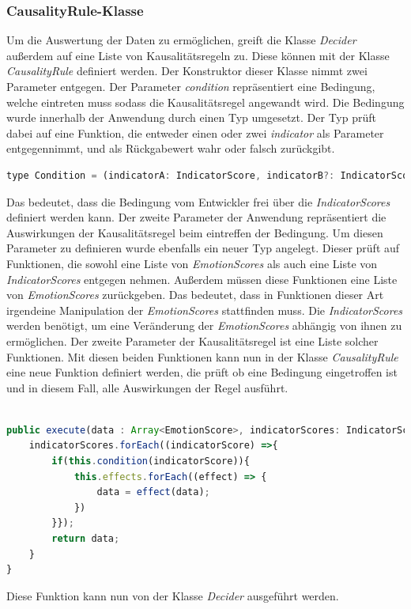 \subsubsection{CausalityRule-Klasse}
Um die Auswertung der Daten zu ermöglichen, greift die Klasse \textit{Decider} außerdem auf eine Liste von Kausalitätsregeln zu. Diese können mit der Klasse \textit{CausalityRule} definiert werden.
Der Konstruktor dieser Klasse nimmt zwei Parameter entgegen. Der Parameter \textit{condition} repräsentiert eine Bedingung, welche eintreten muss sodass die Kausalitätsregel angewandt wird. Die Bedingung wurde innerhalb der Anwendung durch einen Typ umgesetzt. Der Typ prüft dabei auf eine Funktion, die entweder einen oder zwei \textit{indicator} als Parameter entgegennimmt, und als Rückgabewert wahr oder falsch zurückgibt.\newline
\begin{lstlisting}[caption={Typ condition}, language=JavaScript]
	type Condition = (indicatorA: IndicatorScore, indicatorB?: IndicatorScore) => boolean;
\end{lstlisting}
Das bedeutet, dass die Bedingung vom Entwickler frei über die \textit{IndicatorScores} definiert werden kann. Der zweite Parameter der Anwendung repräsentiert die Auswirkungen der Kausalitätsregel beim eintreffen der Bedingung. Um diesen Parameter zu definieren wurde ebenfalls ein neuer Typ angelegt. Dieser prüft auf Funktionen, die sowohl eine Liste von \textit{EmotionScores} als auch eine Liste von \textit{IndicatorScores} entgegen nehmen. Außerdem müssen diese Funktionen eine Liste von \textit{EmotionScores} zurückgeben. Das bedeutet, dass in Funktionen dieser Art irgendeine Manipulation der \textit{EmotionScores} stattfinden muss. Die \textit{IndicatorScores} werden benötigt, um eine Veränderung der \textit{EmotionScores} abhängig von ihnen zu ermöglichen. Der zweite Parameter der Kausalitätsregel ist eine Liste solcher Funktionen. Mit diesen beiden Funktionen kann nun in der Klasse \textit{CausalityRule} eine neue Funktion definiert werden, die prüft ob eine Bedingung eingetroffen ist und in diesem Fall, alle Auswirkungen der Regel ausführt. \newline
\begin{lstlisting}[caption={execute Funktion der Klasse CausalityRule},language=JavaScript]

public execute(data : Array<EmotionScore>, indicatorScores: IndicatorScore[]) {
	indicatorScores.forEach((indicatorScore) =>{
		if(this.condition(indicatorScore)){
			this.effects.forEach((effect) => {
				data = effect(data);
			})
		}});
		return data;
	}
}

\end{lstlisting}
Diese Funktion kann nun von der Klasse \textit{Decider} ausgeführt werden.
